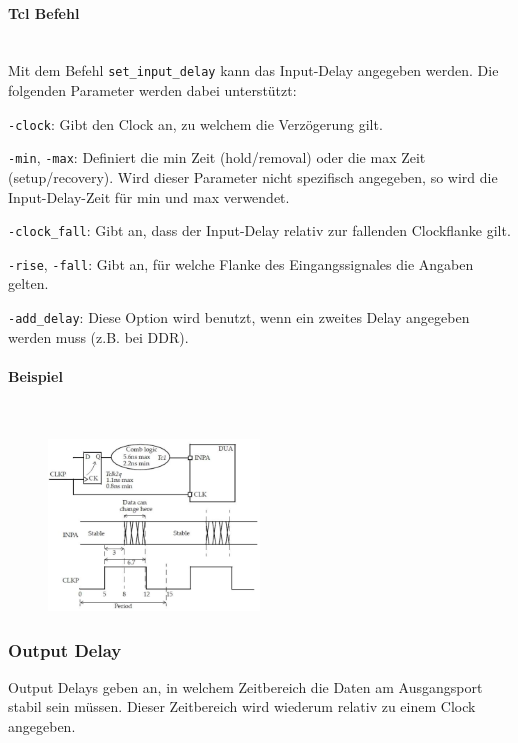 \paragraph{Tcl Befehl}$~$ \\
Mit dem Befehl \texttt{set\_input\_delay} kann das Input-Delay angegeben werden. Die folgenden Parameter werden dabei unterstützt:
\begin{compactitem}
    \item \texttt{-clock}: Gibt den Clock an, zu welchem die Verzögerung gilt.
    \item \texttt{-min}, \texttt{-max}: Definiert die min Zeit (hold/removal) oder die max Zeit (setup/recovery). Wird dieser Parameter nicht spezifisch angegeben, so wird die Input-Delay-Zeit für min und max verwendet.
    \item \texttt{-clock\_fall}: Gibt an, dass der Input-Delay relativ zur fallenden Clockflanke gilt.
    \item \texttt{-rise}, \texttt{-fall}: Gibt an, für welche Flanke des Eingangssignales die Angaben gelten.
    \item \texttt{-add\_delay}: Diese Option wird benutzt, wenn ein zweites Delay angegeben werden muss (z.B. bei DDR).
\end{compactitem}

\paragraph{Beispiel}$~$ \\
\begin{figure}[H]
    \includegraphics[width=0.5\textwidth]{images/input_delay.png}
\end{figure}


\subsubsection{Output Delay} \label{chapter:output_delay}
Output Delays geben an, in welchem Zeitbereich die Daten am Ausgangsport stabil sein müssen. Dieser Zeitbereich wird wiederum relativ zu einem Clock angegeben.

